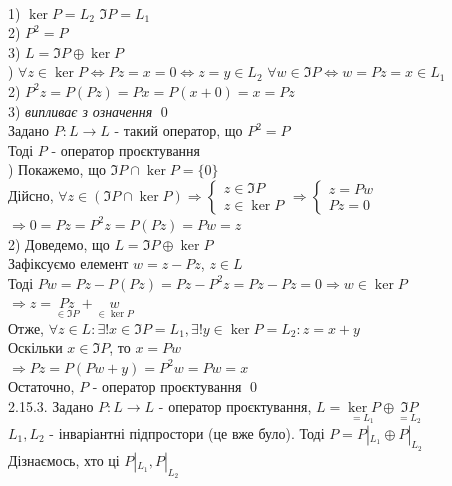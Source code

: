 \documentclass{math_library}
\begin{document}
\\
1) $\ker P = L_2$ \hspace{1cm} $\Im P = L_1$\\
2) $P^2 = P$\\
3) $L = \Im P  \oplus  \ker P$\\
) $\forall z \in \ker P \iff Pz = x = 0 \iff z = y \in L_2$
$\forall w \in \Im P \iff w = Pz = x \in L_1$
\bigskip \\
2) $P^2z = P(Pz) = Px = P(x+0)=x=Pz$
\bigskip \\
3) \textit{випливає з означення} \qed
\bigskip \\
 Задано $P: L \to L$ - такий оператор, що $P^2 = P$\\
Тоді $P$ - оператор проєктування\\
) Покажемо, що $\Im P \cap \ker P = \{0\}$\\
Дійсно, $\forall z \in (\Im P \cap \ker P) \Rightarrow \begin{cases} z \in \Im P \\ z \in \ker P \end{cases} \Rightarrow \begin{cases} z = Pw \\ Pz = 0 \end{cases}$\\
$\Rightarrow 0 = Pz = P^2z = P(Pz) = Pw = z$
\bigskip \\
2) Доведемо, що $L = \Im P  \oplus  \ker P$\\
Зафіксуємо елемент $w = z - Pz$, $z \in L$\\
Тоді $Pw = Pz - P(Pz) = Pz - P^2z = Pz - Pz = 0 \Rightarrow w \in \ker P$\\
$\Rightarrow z = \underset{\in \Im P}{Pz} + \underset{\in \ker P}{w}$\\
Отже, $\forall z \in L: \exists! x \in \Im P = L_1, \exists! y \in \ker P = L_2: z = x+y$\\
Оскільки $x \in \Im P$, то $x = Pw$\\
$\Rightarrow Pz = P(Pw+y) = P^2 w = Pw = x$\\
Остаточно, $P$ - оператор проєктування \qed
\bigskip \\
\rm{2.15.3.} Задано $P: L \to L$ - оператор проєктування, $L = \underset{=L_1}{\ker P}  \oplus  \underset{=L_2}{\Im P}$\\
$L_1,L_2$ - інваріантні підпростори (це вже було). Тоді $P = P|_{L_1}  \oplus  P|_{L_2}$\\
Дізнаємось, хто ці $P|_{L_1}, P|_{L_2}$\\
\end{document}
